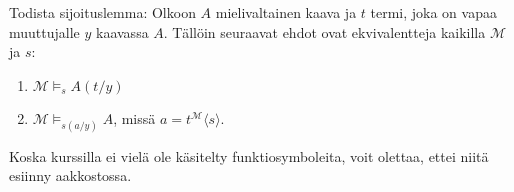 \documentclass[11pt,a4paper]{amsart}
\begin{document}
\begin{exercise}
  Todista sijoituslemma: Olkoon \(A\) mielivaltainen kaava ja \(t\) termi,
  joka on vapaa muuttujalle \(y\) kaavassa \(A\). Tällöin seuraavat ehdot
  ovat ekvivalentteja kaikilla \(\mathcal M\) ja \(s\):
  \leavevmode\par
  \begin{enumerate}[label=(\alph*)]
    \item \(\mathcal M \models_s A(t/y)\)
    \item \(\mathcal M \models_{s(a/y)} A\), missä
      \(a = t^{\mathcal M}\langle s\rangle\).
  \end{enumerate}
  Koska kurssilla ei vielä ole käsitelty funktiosymboleita, voit olettaa,
  ettei niitä esiinny aakkostossa.
\end{exercise}
\end{document}
